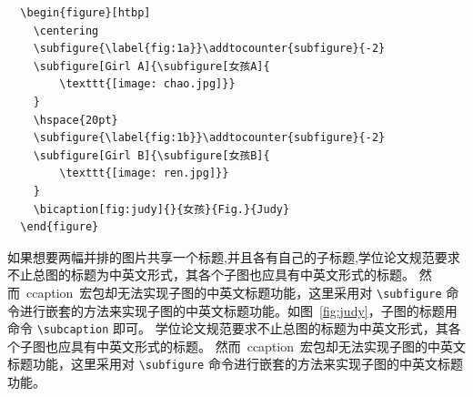 \begin{lstlisting}
  \begin{figure}[htbp]
    \centering
    \subfigure{\label{fig:1a}}\addtocounter{subfigure}{-2}
    \subfigure[Girl A]{\subfigure[女孩A]{
        \texttt{[image: chao.jpg]}}
    }
    \hspace{20pt}
    \subfigure{\label{fig:1b}}\addtocounter{subfigure}{-2}
    \subfigure[Girl B]{\subfigure[女孩B]{
        \texttt{[image: ren.jpg]}}
    }
    \bicaption[fig:judy]{}{女孩}{Fig.}{Judy}
  \end{figure}
\end{lstlisting}


如果想要两幅并排的图片共享一个标题,并且各有自己的子标题,学位论文规范要求不止总图的标题为中英文形式，其各个子图也应具有中英文形式的标题。
然而~ccaption~宏包却无法实现子图的中英文标题功能，这里采用对 \verb|\subfigure| 命令进行嵌套的方法来实现子图的中英文标题功能。如图~\ref{fig:judy}，子图的标题用命令 \verb|\subcaption| 即可。
学位论文规范要求不止总图的标题为中英文形式，其各个子图也应具有中英文形式的标题。
然而~ccaption~宏包却无法实现子图的中英文标题功能，这里采用对 \verb|\subfigure| 命令进行嵌套的方法来实现子图的中英文标题功能。

